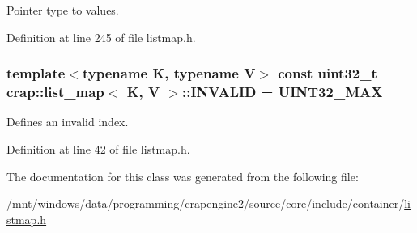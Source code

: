 Pointer type to values. 



Definition at line 245 of file listmap.\+h.

\hypertarget{classcrap_1_1list__map_a313f6d46ae51b1bcd274860ee7e8c2a0}{}
\subsubsection[{I\+N\+V\+A\+L\+I\+D}]{\setlength{\rightskip}{0pt plus 5cm}template$<$typename K, typename V$>$ const uint32\+\_\+t {\bf crap\+::list\+\_\+map}$<$ K, V $>$\+::I\+N\+V\+A\+L\+I\+D = {\bf U\+I\+N\+T32\+\_\+\+M\+A\+X}\hspace{0.3cm}{\ttfamily [static]}}\label{classcrap_1_1list__map_a313f6d46ae51b1bcd274860ee7e8c2a0}


Defines an invalid index. 



Definition at line 42 of file listmap.\+h.



The documentation for this class was generated from the following file\+:\begin{DoxyCompactItemize}
\item 
/mnt/windows/data/programming/crapengine2/source/core/include/container/\hyperlink{listmap_8h}{listmap.\+h}\end{DoxyCompactItemize}
